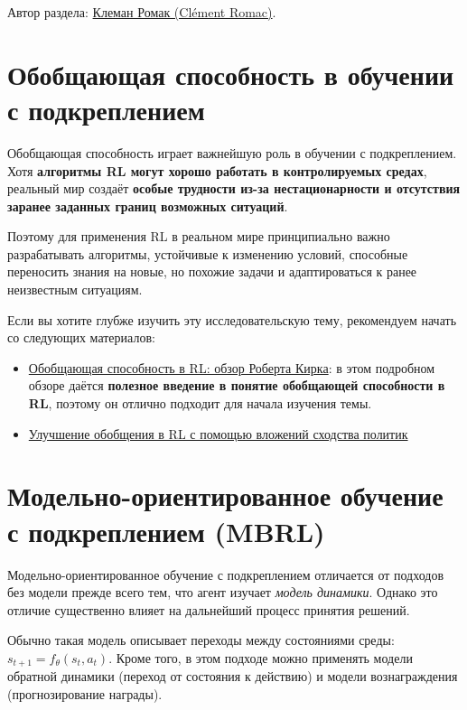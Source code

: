\documentclass[11pt,a4paper]{article}
\begin{document}
Автор раздела: \href{https://twitter.com/ClementRomac}{Клеман Ромак (Clément Romac)}.

\section{Обобщающая способность в обучении с подкреплением}\label{generalization-in-reinforcement-learning}

Обобщающая способность играет важнейшую роль в обучении с подкреплением. Хотя \textbf{алгоритмы RL могут хорошо работать в контролируемых средах}, реальный мир создаёт \textbf{особые трудности из-за нестационарности и отсутствия заранее заданных границ возможных ситуаций}.

Поэтому для применения RL в реальном мире принципиально важно разрабатывать алгоритмы, устойчивые к изменению условий, способные переносить знания на новые, но похожие задачи и адаптироваться к ранее неизвестным ситуациям.

Если вы хотите глубже изучить эту исследовательскую тему, рекомендуем начать со следующих материалов:

\begin{itemize}
\item
  \href{https://robertkirk.github.io/2022/01/17/generalisation-in-reinforcement-learning-survey.html}{Обобщающая способность в RL: обзор Роберта Кирка}: в этом подробном обзоре даётся \textbf{полезное введение в понятие обобщающей способности в RL}, поэтому он отлично подходит для начала изучения темы.
\item
  \href{https://blog.research.google/2021/09/improving-generalization-in.html?m=1}{Улучшение обобщения в RL с помощью вложений сходства политик}
\end{itemize}

\section{Модельно-ориентированное обучение с подкреплением (MBRL)}\label{model-based-reinforcement-learning-mbrl}

Модельно-ориентированное обучение с подкреплением отличается от подходов без модели прежде всего тем, что агент изучает \emph{модель динамики}. Однако это отличие существенно влияет на дальнейший процесс принятия решений.

Обычно такая модель описывает переходы между состояниями среды: \(s_{t+1} = f_\theta (s_t, a_t)\). Кроме того, в этом подходе можно применять модели обратной динамики (переход от состояния к действию) и модели вознаграждения (прогнозирование награды).
\end{document}
